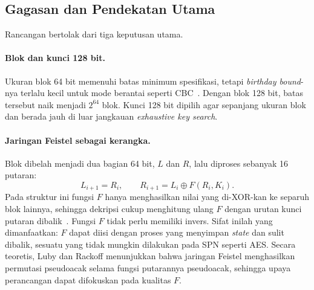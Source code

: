 \subsection{Gagasan dan Pendekatan Utama}
Rancangan \algname{} bertolak dari tiga keputusan utama.

\paragraph{Blok dan kunci 128 bit.} Ukuran blok 64 bit memenuhi batas minimum spesifikasi, tetapi
\textit{birthday bound}-nya terlalu kecil untuk mode berantai seperti CBC~\cite{sweet32}. Dengan blok
128 bit, batas tersebut naik menjadi $2^{64}$ blok. Kunci 128 bit dipilih agar sepanjang ukuran blok
dan berada jauh di luar jangkauan \textit{exhaustive key search}.

\paragraph{Jaringan Feistel sebagai kerangka.} Blok dibelah menjadi dua bagian 64 bit, $L$ dan $R$,
lalu diproses sebanyak 16 putaran:
\begin{equation}
  L_{i+1} = R_i, \qquad R_{i+1} = L_i \oplus F(R_i, K_i).
\end{equation}
Pada struktur ini fungsi $F$ hanya menghasilkan nilai yang di-XOR-kan ke separuh blok lainnya, sehingga
dekripsi cukup menghitung ulang $F$ dengan urutan kunci putaran dibalik~\cite{rinaldi,sucipta}. Fungsi
$F$ tidak perlu memiliki invers. Sifat inilah yang dimanfaatkan: $F$ dapat diisi dengan proses yang
menyimpan \textit{state} dan sulit dibalik, sesuatu yang tidak mungkin dilakukan pada SPN seperti AES.
Secara teoretis, Luby dan Rackoff menunjukkan bahwa jaringan Feistel menghasilkan
permutasi pseudoacak selama fungsi putarannya pseudoacak, sehingga upaya perancangan dapat difokuskan
pada kualitas $F$.

